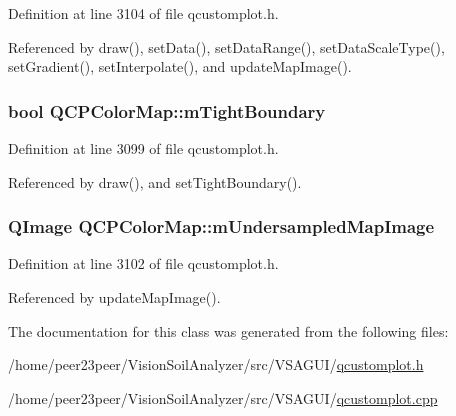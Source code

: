 Definition at line 3104 of file qcustomplot.\+h.



Referenced by draw(), set\+Data(), set\+Data\+Range(), set\+Data\+Scale\+Type(), set\+Gradient(), set\+Interpolate(), and update\+Map\+Image().

\hypertarget{class_q_c_p_color_map_ac2e9425fe4381b496726e1c09f978302}{}
\subsubsection[{m\+Tight\+Boundary}]{\setlength{\rightskip}{0pt plus 5cm}bool Q\+C\+P\+Color\+Map\+::m\+Tight\+Boundary\hspace{0.3cm}{\ttfamily [protected]}}\label{class_q_c_p_color_map_ac2e9425fe4381b496726e1c09f978302}


Definition at line 3099 of file qcustomplot.\+h.



Referenced by draw(), and set\+Tight\+Boundary().

\hypertarget{class_q_c_p_color_map_acad3d52f3572436d5f2e4057911ea8d3}{}
\subsubsection[{m\+Undersampled\+Map\+Image}]{\setlength{\rightskip}{0pt plus 5cm}Q\+Image Q\+C\+P\+Color\+Map\+::m\+Undersampled\+Map\+Image\hspace{0.3cm}{\ttfamily [protected]}}\label{class_q_c_p_color_map_acad3d52f3572436d5f2e4057911ea8d3}


Definition at line 3102 of file qcustomplot.\+h.



Referenced by update\+Map\+Image().



The documentation for this class was generated from the following files\+:\begin{DoxyCompactItemize}
\item 
/home/peer23peer/\+Vision\+Soil\+Analyzer/src/\+V\+S\+A\+G\+U\+I/\hyperlink{qcustomplot_8h}{qcustomplot.\+h}\item 
/home/peer23peer/\+Vision\+Soil\+Analyzer/src/\+V\+S\+A\+G\+U\+I/\hyperlink{qcustomplot_8cpp}{qcustomplot.\+cpp}\end{DoxyCompactItemize}

